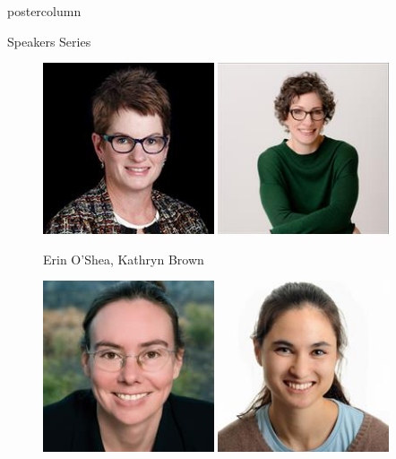 \documentclass{beamer}
\begin{document}
\begin{frame}
\begin{columns}
\begin{column}{.33\textwidth}
\begin{beamercolorbox}[center,wd=\textwidth]{postercolumn}
\begin{minipage}[T]{.95\textwidth}
{\begin{myblock}{Speakers Series}
\begin{addmargin}[1em]{1em}
\begin{figure}
                    \centering\includegraphics[width=0.45\textwidth]{img/erin.jpg}
                    \centering\includegraphics[width=0.45\textwidth]{img/kathryn.jpg}
                    \caption{Erin O'Shea, Kathryn Brown}
                    \label{fig:workspace}
                    \vspace{1.3cm}
                \end{figure}
                \begin{figure}
                    \centering\includegraphics[width=0.45\textwidth]{img/roian.jpg}
                    \centering\includegraphics[width=0.45\textwidth]{img/kristin.jpg}

\end{figure}
\end{addmargin}
\end{myblock}}
\end{minipage}
\end{beamercolorbox}
\end{column}
\end{columns}
\end{frame}
\end{document}
